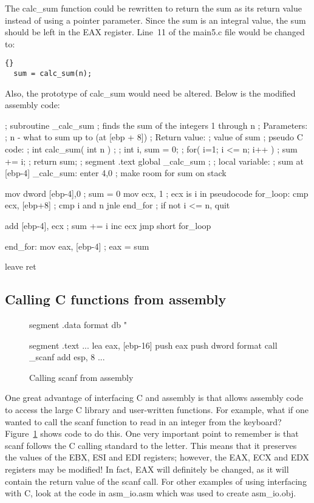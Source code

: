The {\code calc\_sum} function could be rewritten to return the sum as its
return value instead of using a pointer parameter. Since the sum is an
integral value, the sum should be left in the EAX register. Line~11 of the
{\code main5.c} file would be changed to:
\begin{lstlisting}[stepnumber=0]{}
  sum = calc_sum(n);
\end{lstlisting}
Also, the prototype of {\code calc\_sum} would need be altered. Below is
the modified assembly code:
\begin{AsmCodeListing}[label=sub6.asm]
; subroutine _calc_sum
; finds the sum of the integers 1 through n
; Parameters:
;   n    - what to sum up to (at [ebp + 8])
; Return value:
;   value of sum
; pseudo C code:
; int calc_sum( int n )
; {
;   int i, sum = 0;
;   for( i=1; i <= n; i++ )
;     sum += i;
;   return sum;
; }
segment .text
        global  _calc_sum
;
; local variable:
;   sum at [ebp-4]
_calc_sum:
        enter   4,0               ; make room for sum on stack

        mov     dword [ebp-4],0   ; sum = 0
        mov     ecx, 1            ; ecx is i in pseudocode
for_loop:
        cmp     ecx, [ebp+8]      ; cmp i and n
        jnle    end_for           ; if not i <= n, quit

        add     [ebp-4], ecx      ; sum += i
        inc     ecx
        jmp     short for_loop

end_for:
        mov     eax, [ebp-4]      ; eax = sum

        leave
        ret
\end{AsmCodeListing}

\subsection{Calling C functions from assembly}

\begin{figure}[t]
\begin{AsmCodeListing}[frame=single]
segment .data
format       db "%

segment .text
...
      lea    eax, [ebp-16]
      push   eax
      push   dword format
      call   _scanf
      add    esp, 8
...
\end{AsmCodeListing}
\caption{Calling {\code scanf} from assembly\label{fig:scanf}}
\end{figure}

One great advantage of interfacing C and assembly is that allows
assembly code to access the large C library and user-written functions.
For example, what if one wanted to call the {\code scanf} function to
read in an integer from the keyboard? Figure~\ref{fig:scanf} shows
code to do this. One very important point to remember is that {\code
scanf} follows the C calling standard to the letter. This means that it
preserves the values of the EBX, ESI and EDI registers; however, the
EAX, ECX and EDX registers may be modified! In fact, EAX will definitely
be changed, as it will contain the return value of the {\code scanf} call.
For other examples of using interfacing with C, look at the code in
{\code asm\_io.asm} which was used to create {\code asm\_io.obj}.

